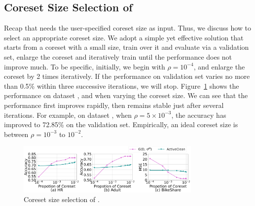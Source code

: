 \vspace{-0.5em}
\subsection{Coreset Size Selection of \ours}
\label{exp:sec:end2end}



Recap that \ours needs the user-specified coreset size as input. Thus, we discuss how to select an appropriate coreset size. We adopt a simple yet effective solution that starts from a coreset with a small size, train over it and
evaluate via a validation set, enlarge the coreset and iteratively
train  until the performance does not improve much. 
To be specific, initially, we begin with $\rho = 10^{-4}$, and   enlarge the coreset by 2 times iteratively. If the performance on validation set varies no more than 0.5\% within three
successive iterations, we will
stop.
 Figure~\ref{fig:e2e} shows the performance on dataset \hr, \adult and \bike when varying the coreset size. We can see that the performance first improves rapidly, then remains  stable just after several iterations. For example, on dataset \adult, when $\rho=5\times 10^{-3}$, the accuracy has improved  to 72.85\% on the validation set. Empirically, an ideal coreset size is between $\rho=10^{-3}$ to $10^{-2}$.

 \begin{figure}
	\vspace{-1em}
	\centering
	\includegraphics[width=0.8\textwidth]{figs/e2e}
	\caption{ Coreset size selection of \ours.}
	\label{fig:e2e}
\end{figure}
 
